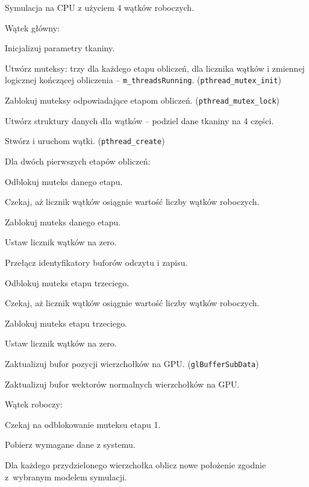 		\begin{algorithm}[H]
			\label{alg_5_3}
			\caption{Symulacja na CPU z użyciem 4 wątków roboczych.}	
			Wątek główny:
			
			\Indp
			
			Inicjalizuj parametry tkaniny.
			
			Utwórz muteksy: trzy dla każdego etapu obliczeń, dla licznika wątków i zmiennej logicznej kończącej obliczenia -- \texttt{m\_threadsRunning}. (\texttt{pthread\_mutex\_init})
			
			Zablokuj muteksy odpowiadające etapom obliczeń. (\texttt{pthread\_mutex\_lock})
			
			Utwórz struktury danych dla wątków -- podziel dane tkaniny na 4 części.
			
			Stwórz i uruchom wątki. (\texttt{pthread\_create})
			
			{
				Dla dwóch pierwszych etapów obliczeń:
				
				\Indp
					Odblokuj muteks danego etapu.
					
					Czekaj, aż licznik wątków osiągnie wartość liczby wątków roboczych.
					
					Zablokuj muteks danego etapu.
					
					Ustaw licznik wątków na zero.
					
					Przełącz identyfikatory buforów odczytu i zapisu.
				\Indm
				
				Odblokuj muteks etapu trzeciego.
				
				Czekaj, aż licznik wątków osiągnie wartość liczby wątków roboczych.
				
				Zablokuj muteks etapu trzeciego.
				
				Ustaw licznik wątków na zero.
				
				Zaktualizuj bufor pozycji wierzchołków na GPU. (\texttt{glBufferSubData})
				
				Zaktualizuj bufor wektorów normalnych wierzchołków na GPU.
			}
			
			\Indm
			
			Wątek roboczy:
			
			\Indp
			
			{
				Czekaj na odblokowanie muteksu etapu 1.
				
				Pobierz wymagane dane z systemu.
				
				Dla każdego przydzielonego wierzchołka oblicz nowe położenie zgodnie z~wybranym modelem symulacji.
				
}
\end{algorithm}
